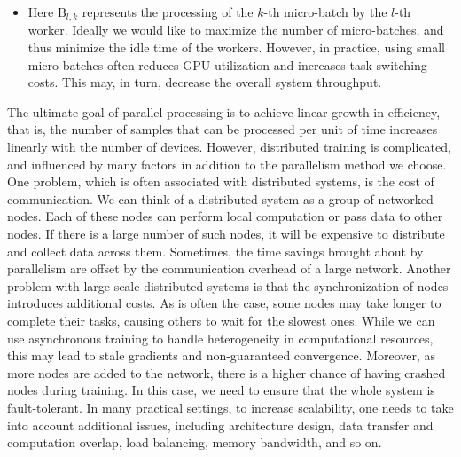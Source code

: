 \begin{itemize}
\item[] Here $\mathrm{B}_{l,k}$ represents the processing of the $k$-th micro-batch by the $l$-th worker. Ideally we would like to maximize the number of micro-batches, and thus minimize the idle time of the workers. However, in practice, using small micro-batches often reduces GPU utilization and increases task-switching costs. This may, in turn, decrease the overall system throughput.
\end{itemize}
\vspace{0.5em}

The ultimate goal of parallel processing is to achieve linear growth in efficiency, that is, the number of samples that can be processed per unit of time increases linearly with the number of devices. However, distributed training is complicated, and influenced by many factors in addition to the parallelism method we choose. One problem, which is often associated with distributed systems, is the cost of communication. We can think of a distributed system as a group of networked nodes. Each of these nodes can perform local computation or pass data to other nodes. If there is a large number of such nodes, it will be expensive to distribute and collect data across them. Sometimes, the time savings brought about by parallelism are offset by the communication overhead of a large network. Another problem with large-scale distributed systems is that the synchronization of nodes introduces additional costs. As is often the case, some nodes may take longer to complete their tasks, causing others to wait for the slowest ones. While we can use asynchronous training to handle heterogeneity in computational resources, this may lead to stale gradients and non-guaranteed convergence. Moreover, as more nodes are added to the network, there is a higher chance of having crashed nodes during training. In this case, we need to ensure that the whole system is fault-tolerant. In many practical settings, to increase scalability, one needs to take into account additional issues, including architecture design, data transfer and computation overlap, load balancing, memory bandwidth, and so on.

